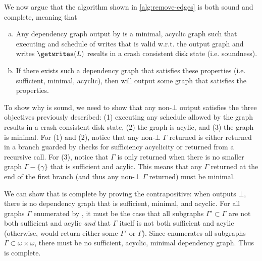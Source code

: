 We now argue that the algorithm shown in \autoref{alg:remove-edges} is both sound and complete, meaning that
\begin{enumerate}[(a)]
\item Any dependency graph output by \graphsearch is a minimal, acyclic graph such that executing
      and schedule of writes that is valid w.r.t. the output graph and writes $\getwrites(L)$
      results in a crash consistent disk state (i.e. soundness).
\item If there exists such a dependency graph that satisfies these properties (i.e. sufficient, minimal,
      acyclic), then \graphsearch will output some graph that satisfies the properties.
\end{enumerate}

To show why \graphsearch is sound, we need to show that any non-$\bot$ output satisfies the three
objectives previously described: (1) executing any schedule allowed by the graph results in a crash
consistent disk state, (2) the graph is acylic, and (3) the graph is minimal. For (1) and (2), notice
that any non-$\bot$ $\Gamma$ returned is either returned in a branch guarded by checks
for sufficiency acyclicity or returned from a recursive call. For (3), notice that $\Gamma$ is only returned
when there is no smaller graph $\Gamma - \{\gamma\}$ that is sufficient and acylic.
This means that any $\Gamma$ returned at the end of the first branch (and thus any non-$\bot$ $\Gamma$ returned)
must be minimal.

We can show that \graphsearch is complete by proving the contrapositive: when \graphsearch outputs $\bot$,
there is no dependency graph that is sufficient, minimal, and acyclic. For all graphs $\Gamma$ enumerated
by \graphsearch, it must be the case that all subgraphs $\Gamma'\subset\Gamma$
are not both sufficient and acylic \textit{and} that $\Gamma$ itself is not both sufficient and acylic
(otherwise, \graphsearch would return either some $\Gamma'$ or $\Gamma$). Since \graphsearch enumerates
all subgraphs $\Gamma\subset\omega\times\omega$, there must be no sufficient, acyclic, minimal dependency graph.
Thus \graphsearch is complete.

